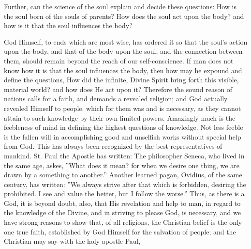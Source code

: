 Further, can the science of the soul explain and decide these questions: How is the soul born of the souls of parents? How does the soul act upon the body? and how is it that the soul influences the body?

God Himself, to ends which are most wise, has ordered it so that the soul's action upon the body, and that of the body upon the soul, and the connection between them, should remain beyond the reach of our self-conscience. If man does not know how it is that the soul influences the body, then how may he expound and define the questions, How did the infinite, Divine Spirit bring forth this visible, material world? and how does He act upon it? Therefore the sound reason of nations calls for a faith, and demands a revealed religion; and God actually revealed Himself to people. which for them was and is necessary, as they cannot attain to such knowledge by their own limited powers. Amazingly much is the feebleness of mind in defining the highest questions of knowledge. Not less feeble is the fallen will in accomplishing good and unselfish works without special help from God. This has always been recognized by the best representatives of mankind. St. Paul the Apostle has written:  The philosopher Seneca, who lived in the same age, askes, ''What does it mean? for when we desire one thing, we are drawn by a something to another.'' Another learned pagan, Ovidius, of the same century, has written: ''We always strive after that which is forbidden, desiring the prohibited. I see and value the better, but I follow the worse.'' Thus, as there is a God, it is beyond doubt, also, that His revelation and help to man, in regard to the knowledge of the Divine, and in striving to please God, is necessary, and we have strong reasons to show that, of all religions, the Christian belief is the only one true faith, established by God Himself for the salvation of people; and the Christian may say with the holy apostle Paul, 

